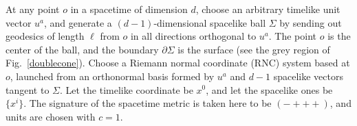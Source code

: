 \documentclass[aps,prd,showpacs,groupedaddress,nofootinbib,longbibliography,12pt]{revtex4-1}
\def\beq{\begin{equation}}
\def\eeq{\end{equation}}
\def\d{\delta}\def\D{\Delta}
\begin{document}
At any point $o$ in a spacetime of dimension $d$, choose an arbitrary timelike unit vector $u^a$, and generate a $(d-1)$-dimensional spacelike ball $\Sigma$ by sending out geodesics of length $\ell$ from $o$ in all directions orthogonal to $u^a$. 
The point $o$ is the center of the ball, and the boundary $\partial \Sigma$ is the surface (see the grey region of Fig.~\ref{doublecone}). 
Choose a Riemann normal coordinate (RNC) system based at $o$, launched from an orthonormal basis formed by 
$u^a$ and $d-1$ spacelike vectors tangent to $\Sigma$.  Let the timelike coordinate be $x^0$, and
let the spacelike ones be $\{x^i\}$. The signature of the spacetime metric is taken here to be $({-}{+}{+}{+})$, and units are chosen with $c=1$.
%
\end{document}
